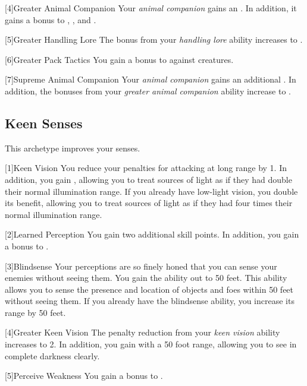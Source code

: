         [4]{Greater Animal Companion} Your \textit{animal companion} gains an .
        In addition, it gains a  bonus to , , and .

        [5]{Greater Handling Lore} The bonus from your \textit{handling lore} ability increases to .

        [6]{Greater Pack Tactics} You gain a  bonus to  against  creatures.

        [7]{Supreme Animal Companion} Your \textit{animal companion} gains an additional .
        In addition, the bonuses from your \textit{greater animal companion} ability increase to .

    \subsection{Keen Senses}
        This archetype improves your senses.

        [1]{Keen Vision}
        You reduce your  penalties for attacking at long range by 1.
        In addition, you gain , allowing you to treat sources of light as if they had double their normal illumination range.
        If you already have low-light vision, you double its benefit, allowing you to treat sources of light as if they had four times their normal illumination range.

        [2]{Learned Perception} You gain two additional skill points.
        In addition, you gain a  bonus to .

        [3]{Blindsense}
        Your perceptions are so finely honed that you can sense your enemies without seeing them.
        You gain the  ability out to 50 feet.
        This ability allows you to sense the presence and location of objects and foes within 50 feet without seeing them.
        If you already have the blindsense ability, you increase its range by 50 feet.

        [4]{Greater Keen Vision} The penalty reduction from your \textit{keen vision} ability increases to 2.
        In addition, you gain  with a 50 foot range, allowing you to see in complete darkness clearly.

        [5]{Perceive Weakness}
        You gain a  bonus to .


